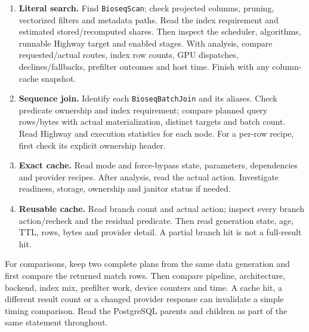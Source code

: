 \begin{enumerate}
  \item \textbf{Literal search.} Find \texttt{BioseqScan}; check projected
    columns, pruning, vectorized filters and metadata paths. Read the index
    requirement and estimated stored/recomputed shares. Then inspect the
    scheduler, algorithms, runnable Highway target and enabled stages. With
    analysis, compare requested/actual routes, index row counts, GPU dispatches,
    declines/fallbacks, prefilter outcomes and host time. Finish with any
    column-cache snapshot.
  \item \textbf{Sequence join.} Identify each \texttt{BioseqBatchJoin} and
    its aliases. Check predicate ownership and index requirement; compare
    planned query rows/bytes with actual materialization, distinct targets and
    batch count. Read Highway and execution statistics for each node. For a
    per-row recipe, first check its explicit ownership header.
  \item \textbf{Exact cache.} Read mode and force-bypass state, parameters,
    dependencies and provider recipes. After analysis, read the actual action.
    Investigate readiness, storage, ownership and janitor status if needed.
  \item \textbf{Reusable cache.} Read branch count and actual action;
    inspect every branch action/recheck and the residual predicate. Then read
    generation state, age, TTL, rows, bytes and provider detail. A partial
    branch hit is not a full-result hit.
\end{enumerate}

For comparisons, keep two complete plans from the same data generation and
first compare the returned match rows. Then compare pipeline, architecture,
backend, index mix, prefilter work, device counters and time. A cache hit,
a different result count or a changed provider response can invalidate a
simple timing comparison. Read the PostgreSQL parents and children as part of
the same statement throughout.
